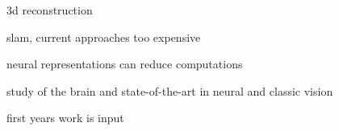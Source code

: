 3d reconstruction

slam, current approaches too expensive

neural representations can reduce computations

study of the brain and state-of-the-art in neural and classic vision

first years work is input


